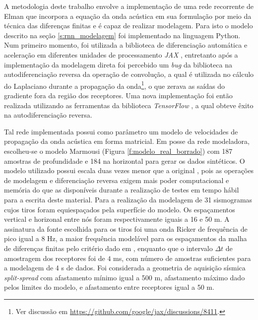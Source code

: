     A metodologia deste trabalho envolve a implementação de uma rede recorrente de Elman que incorpora a equação da onda acústica em sua formulação por meio da técnica das diferenças finitas e é capaz de realizar modelagem. Para isto o modelo descrito na seção \ref{s:rnn_modelagem} foi implementado na linguagem Python. Num primeiro momento, foi utilizada a biblioteca de diferenciação automática e aceleração em diferentes unidades de processamento \emph{JAX} , entretanto após a implementação da modelagem direta foi percebido um \textit{bug} da biblioteca na autodiferenciação reversa da operação de convolução, a qual é utilizada no cálculo do Laplaciano durante a propagação da onda\footnote{Ver discussão em \url{https://github.com/google/jax/discussions/8411}.}, o que zerava as saídas do gradiente fora da região dos receptores. Uma nova implementação foi então realizada utilizando as ferramentas da biblioteca \emph{TensorFlow} , a qual obteve êxito na autodiferenciação reversa.
    
    Tal rede implementada possui como parâmetro um modelo de velocidades de propagação da onda acústica em forma matricial. Em posse da rede modeladora, escolheu-se o modelo Marmousi (Figura \ref{f:modelo_real_borrado}) com 187 amostras de profundidade e 184 na horizontal para gerar os dados sintéticos. O modelo utilizado possui escala duas vezes menor que a original , pois as operações de modelagem e diferenciação reversa exigem mais poder computacional e memória do que as disponíveis durante a realização de testes em tempo hábil para a escrita deste material. Para a realização da modelagem de 31 sismogramas cujos tiros foram equiespaçados pela superfície do modelo. Os espaçamentos vertical e horizonal entre nós foram respectivamente iguais a 16 e 50 m. A assinatura da fonte escolhida para os tiros foi uma onda Ricker de frequência de pico igual a 8 Hz, a maior frequência modelável para os espaçamentos da malha de diferenças finitas pelo critério dado em , enquanto que o intervalo $\Delta t$ de amostragem dos receptores foi de $4$ ms, com número de amostras suficientes para a modelagem de 4 s de dados. Foi considerada a geometria de aquisição sísmica \textit{split-spread} com afastamento mínimo igual a 500 m, afastamento máximo dado pelos limites do modelo, e afastamento entre receptores igual a 50 m.

